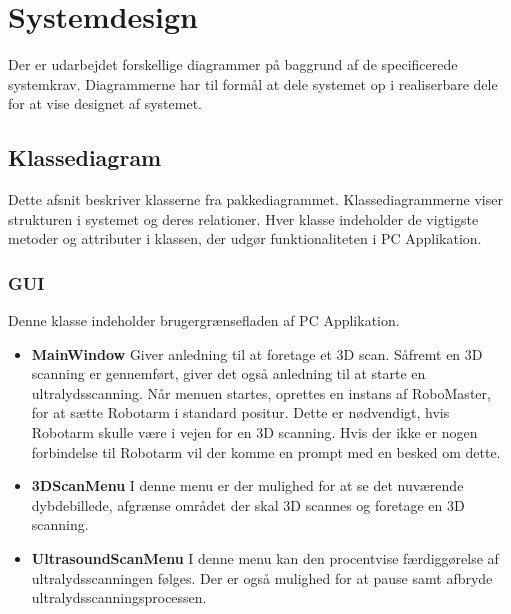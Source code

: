 \chapter{Systemdesign}\label{Systemdesign}
Der er udarbejdet forskellige diagrammer på baggrund af de specificerede systemkrav.  Diagrammerne har til formål at dele systemet op i realiserbare dele for at vise designet af systemet. 

\section{Klassediagram} \label{klassediagram}
Dette afsnit beskriver klasserne fra pakkediagrammet. Klassediagrammerne viser strukturen i systemet og deres relationer. Hver klasse indeholder de vigtigste metoder og attributer i klassen, der udgør funktionaliteten i PC Applikation. 

\subsection{GUI}
Denne klasse indeholder brugergrænsefladen af PC Applikation.

\let\labelitemi\labelitemii
\begin{itemize}
\item{\textbf{MainWindow}}\newline
Giver anledning til at foretage et 3D scan. Såfremt en 3D scanning er gennemført, giver det også anledning til at starte en ultralydsscanning.
Når menuen startes, oprettes en instans af RoboMaster, for at sætte Robotarm i standard positur. Dette er nødvendigt, hvis Robotarm skulle være i vejen for en 3D scanning.
Hvis der ikke er nogen forbindelse til Robotarm vil der komme en prompt med en besked om dette. 

\item{\textbf{3DScanMenu}}\newline
I denne menu er der mulighed for at se det nuværende dybdebillede, afgrænse området der skal 3D scannes og foretage en 3D scanning.

\item{\textbf{UltrasoundScanMenu}}\newline
I denne menu kan den procentvise færdiggørelse af ultralydsscanningen følges. Der er også mulighed for at pause samt afbryde ultralydsscanningsprocessen.
\end{itemize}

